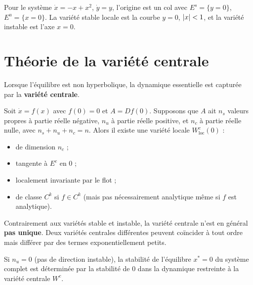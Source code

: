 \begin{exemple}
Pour le syst\`eme $\dot{x} = -x + x^2$, $\dot{y} = y$, l'origine est un
col avec $E^s = \{y = 0\}$, $E^u = \{x = 0\}$. La vari\'et\'e stable locale
est la courbe $y = 0$, $\left| x \right| < 1$, et la vari\'et\'e instable est l'axe $x = 0$.
\end{exemple}

\section{Th\'eorie de la vari\'et\'e centrale}

Lorsque l'\'equilibre est non hyperbolique, la dynamique essentielle est
captur\'ee par la \textbf{vari\'et\'e centrale}.

\begin{theoreme}
\label{thm:variete-centrale}
Soit $\dot{x} = f(x)$ avec $f(0) = 0$ et $A = Df(0)$. Supposons que $A$
ait $n_s$ valeurs propres \`a partie r\'eelle n\'egative, $n_u$ \`a partie
r\'eelle positive, et $n_c$ \`a partie r\'eelle nulle, avec
$n_s + n_u + n_c = n$. Alors il existe une vari\'et\'e locale
$W^c_{\mathrm{loc}}(0)$ :
\begin{itemize}
    \item de dimension $n_c$ ;
    \item tangente \`a $E^c$ en $0$ ;
    \item localement invariante par le flot ;
    \item de classe $C^k$ si $f \in C^k$ (mais pas n\'ecessairement analytique
    m\^eme si $f$ est analytique).
\end{itemize}
\end{theoreme}

\begin{attention}[title=\textbf{Non-unicit\'e de la vari\'et\'e centrale}]
Contrairement aux vari\'et\'es stable et instable, la vari\'et\'e centrale
n'est en g\'en\'eral \textbf{pas unique}. Deux vari\'et\'es centrales diff\'erentes
peuvent co\"incider \`a tout ordre mais diff\'erer par des termes
exponentiellement petits.
\end{attention}

\begin{theoreme}
\label{thm:reduction-centrale}
Si $n_u = 0$ (pas de direction instable), la stabilit\'e de l'\'equilibre
$x^* = 0$ du syst\`eme complet est d\'etermin\'ee par la stabilit\'e de
$0$ dans la dynamique restreinte \`a la vari\'et\'e centrale $W^c$.
\end{theoreme}

